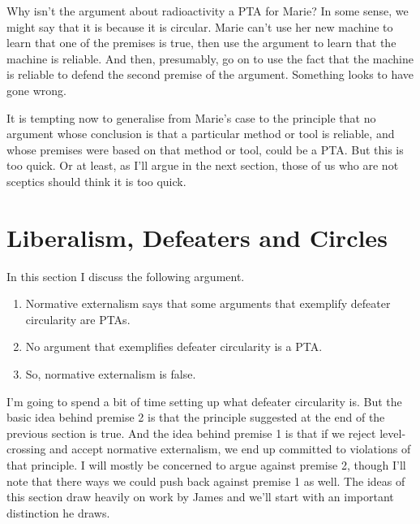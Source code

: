 Why isn't the argument about radioactivity a PTA for \gls{Marie}? In some sense, we might say that it is because it is circular. \gls{Marie} can't use her new machine to learn that one of the premises is true, then use the argument to learn that the machine is reliable. And then, presumably, go on to use the fact that the machine is reliable to defend the second premise of the argument. Something looks to have gone wrong.

It is tempting now to generalise from \gls{Marie}'s case to the principle that no argument whose conclusion is that a particular method or tool is reliable, and whose premises were based on that method or tool, could be a PTA. But this is too quick. Or at least, as I'll argue in the next section, those of us who are not sceptics should think it is too quick.

\section{Liberalism, Defeaters and Circles}
\label{liberalismdefeatersandcircles}

In this section I discuss the following argument.

\begin{enumerate}
\item{} Normative externalism says that some arguments that exemplify defeater circularity are PTAs.

\item{} No argument that exemplifies defeater circularity is a PTA.

\item{} So, normative externalism is false.

\end{enumerate}
I'm going to spend a bit of time setting up what defeater circularity is. But the basic idea behind premise 2 is that the principle suggested at the end of the previous section is true. And the idea behind premise 1 is that if we reject level-crossing and accept normative externalism, we end up committed to violations of that principle. I will mostly be concerned to argue against premise 2, though I'll note that there ways we could push back against premise 1 as well. The ideas of this section draw heavily on work by James \citet{Pryor2004} and we'll start with an important distinction he draws.

